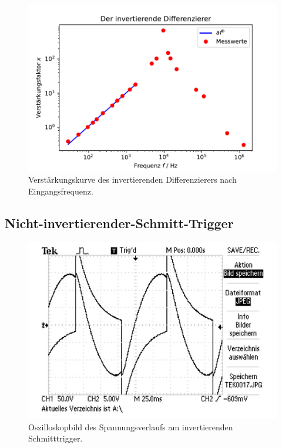   \begin{figure}
    \centering
    \includegraphics{content/grafiken/invdifferenzierer.pdf}
    \caption{Verstärkungskurve des invertierenden Differenzierers nach Eingangsfrequenz.}
    \label{fig:invdifferenzierer}
  \end{figure}





\subsection{Nicht-invertierender-Schmitt-Trigger}
\label{sec:schmitt}
\begin{figure}
    \centering
    \includegraphics[width=1\textwidth]{content/grafiken/schmittTrigger/TEK0017.pdf}
    \caption{Oszilloskopbild des Spannungsverlaufs am invertierenden Schmitttrigger.}
    \label{fig:schmitttrigger}
  \end{figure}




























